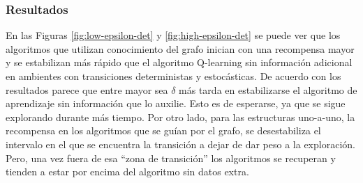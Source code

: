 \subsubsection{Resultados}

En las Figuras \ref{fig:low-epsilon-det} y \ref{fig:high-epsilon-det} se puede ver que los algoritmos que utilizan conocimiento del grafo inician con una recompensa mayor y se estabilizan más rápido que el algoritmo Q-learning
sin información adicional en ambientes con transiciones deterministas y estocásticas.
De acuerdo con los resultados parece que 
entre mayor sea $\delta$ más tarda en estabilizarse
el algoritmo de aprendizaje sin información que lo auxilie. Esto es de esperarse, ya que se sigue explorando durante más tiempo. 
Por otro lado, para las estructuras uno-a-uno, la recompensa en los algoritmos que se guían por el grafo, se desestabiliza el intervalo en el que se encuentra la transición a dejar de dar peso a
la exploración. Pero, una vez fuera de esa ``zona de transición'' los
algoritmos se recuperan y tienden a estar por encima del algoritmo sin datos 
extra.


